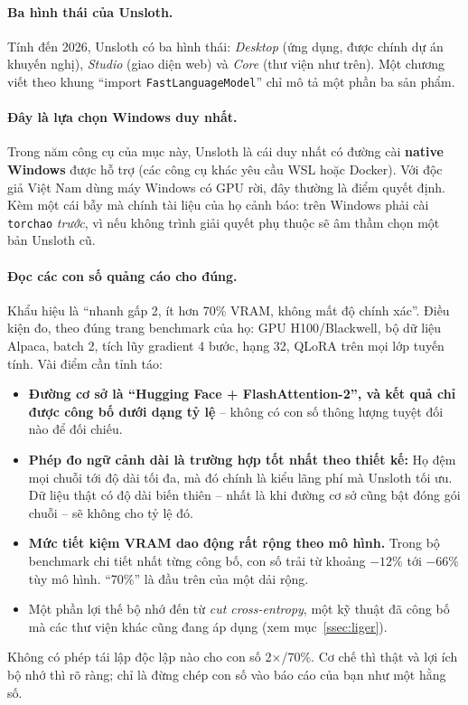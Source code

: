 \paragraph{Ba hình thái của Unsloth.} Tính đến 2026, Unsloth có ba hình thái: \emph{Desktop} (ứng dụng, được chính dự án khuyến nghị), \emph{Studio} (giao diện web) và \emph{Core} (thư viện như trên). Một chương viết theo khung “import \texttt{FastLanguageModel}” chỉ mô tả một phần ba sản phẩm.

\paragraph{Đây là lựa chọn Windows duy nhất.} Trong năm công cụ của mục này, Unsloth là cái duy nhất có đường cài \textbf{native Windows} được hỗ trợ (các công cụ khác yêu cầu WSL hoặc Docker). Với độc giả Việt Nam dùng máy Windows có GPU rời, đây thường là điểm quyết định. Kèm một cái bẫy mà chính tài liệu của họ cảnh báo: trên Windows phải cài \texttt{torchao} \emph{trước}, vì nếu không trình giải quyết phụ thuộc sẽ âm thầm chọn một bản Unsloth cũ.

\paragraph{Đọc các con số quảng cáo cho đúng.} Khẩu hiệu là “nhanh gấp 2, ít hơn 70\% VRAM, không mất độ chính xác”. Điều kiện đo, theo đúng trang benchmark của họ: GPU H100/Blackwell, bộ dữ liệu Alpaca, batch 2, tích lũy gradient 4 bước, hạng 32, QLoRA trên mọi lớp tuyến tính. Vài điểm cần tỉnh táo:
\begin{itemize}
	\item \textbf{Đường cơ sở là “Hugging Face + FlashAttention-2”, và kết quả chỉ được công bố dưới dạng tỷ lệ} -- không có con số thông lượng tuyệt đối nào để đối chiếu.
	\item \textbf{Phép đo ngữ cảnh dài là trường hợp tốt nhất theo thiết kế:} Họ đệm mọi chuỗi tới độ dài tối đa, mà đó chính là kiểu lãng phí mà Unsloth tối ưu. Dữ liệu thật có độ dài biến thiên -- nhất là khi đường cơ sở cũng bật đóng gói chuỗi -- sẽ không cho tỷ lệ đó.
	\item \textbf{Mức tiết kiệm VRAM dao động rất rộng theo mô hình.} Trong bộ benchmark chi tiết nhất từng công bố, con số trải từ khoảng $-12\%$ tới $-66\%$ tùy mô hình. “70\%” là đầu trên của một dải rộng.
	\item Một phần lợi thế bộ nhớ đến từ \emph{cut cross-entropy}, một kỹ thuật đã công bố mà các thư viện khác cũng đang áp dụng (xem mục~\ref{ssec:liger}).
\end{itemize}
Không có phép tái lập độc lập nào cho con số 2$\times$/70\%. Cơ chế thì thật và lợi ích bộ nhớ thì rõ ràng; chỉ là đừng chép con số vào báo cáo của bạn như một hằng số.

